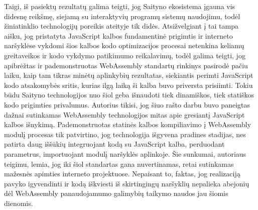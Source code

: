 \documentclass{VUMIFPSkursinis}
\begin{document}
 
Taigi, iš pasiektų rezultatų galima teigti, jog Saityno ekosistema įgauna vis didesnę reikšmę, siejamą su interaktyvių programų sistemų naudojimu, todėl žiniatinklio technologijų poreikis ateityje tik didės. Atsižvelgiant į tai tampa aišku, jog pristatyta JavaScript kalbos fundamentinė prigimtis ir interneto naršyklėse vykdomi šios kalbos kodo optimizacijos procesai netenkina keliamų greitaveikos ir kodo vykdymo patikimumo reikalavimų, todėl galima teigti, jog apibrėžtas ir pademonstruotas WebAssembly standartų rinkinys pasirodė pačiu laiku, kaip tam tikras minėtų aplinkybių rezultatas, siekiantis perimti JavaScript kodo atsakomybės sritis, kurias ilgą laiką ši kalba buvo priversta prisiimti. Tokiu būdu Saityno technologijos nuo šiol geba išnaudoti tiek dinamiškos, tiek statiškos kodo prigimties privalumus. Autorius tikisi, jog šiuo rašto darbu buvo paneigtas dažnai sutinkamas WebAssembly technologijos mitas apie gresiantį JavaScript kalbos išnykimą. Pademonstruotas statinės kalbos kompiliavimo į WebAssembly modulį procesas tik patvirtino, jog technologija išgyvena pradines stadijas, nes patirta daug iššūkių integruojant kodą su JavaScript kalba, perduodant parametrus, importuojant modulį naršyklės aplinkoje. Šie sunkumai, autoriaus teigimu, lemia, jog iki šiol standartas gana nuvertinamas, retai sutinkamas mažesnės apimties interneto projektuose. Nepaisant to, faktas, jog realizaciją pavyko igyvendinti ir kodą iškviesti iš skirtingingų naršyklių nepalieka abejonių dėl WebAssembly panaudojamumo galimybių taikymo naudos jau šiomis dienomis.
\printbibliography[heading=bibintoc, title=Šaltiniai]  %
\end{document}
